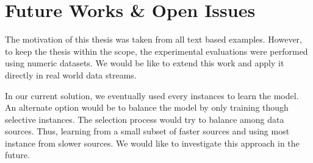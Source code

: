 \section{Future Works \& Open Issues}
The motivation of this thesis was taken from all text based examples. However, to keep the thesis within the scope, the experimental evaluations were performed using numeric datasets. We would be like to extend this work and apply it directly in real world data streams. 

In our current solution, we eventually used every instances to learn the model. An alternate option would be to balance the model by only training though selective instances. The selection process would try to balance among data sources. Thus, learning from a small subset of faster sources and using most instance from slower sources. We would like to investigate this approach in the future.





